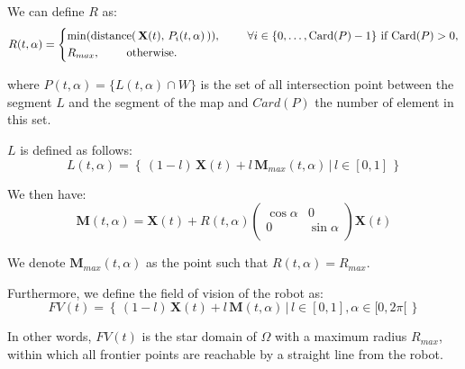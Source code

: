 \documentclass[../main.tex]{subfiles}
\begin{document}
\vspace{0.5em}

We can define $R$ as: 
\begin{equation*}
	\displaystyle
	R(t, \alpha) = 
	\begin{cases*}
		\min(\text{\rmfamily distance}( \, \mathbf{X}(t), \, P_i(t, \alpha) \,)),~~~~~~~ \forall i \in \{0, \ldots, \text{\rmfamily Card}(P) - 1\} ~\text{\rmfamily if Card}(P) > 0,\\
		R_{max}, ~~~~~~~\text{\rmfamily otherwise}.
	\end{cases*}
\end{equation*}
\vspace{0.5em}


where $P(t, \alpha) = \{L(t, \alpha) \cap W\}$ is the set of all intersection point between the segment $L$ and the segment of the map and $Card(P)$ the number of element in this set.
\vspace{0.5em}

$L$ is defined as follows:
\begin{equation*}
	\displaystyle
	L(t, \alpha) = \left\{ \, (1 - l) \, \mathbf{X}(t) + l\, \mathbf{M}_{max}(t, \alpha) \,|\, l \in [0, 1]\, \right\}
\end{equation*}

We then have:
\begin{equation*}
	\displaystyle
	\mathbf{M}(t, \alpha) = \mathbf{X}(t) + R(t, \alpha) 
	\begin{pmatrix}
		\cos \alpha & 0\\
		0 & \sin \alpha\\
	\end{pmatrix} 
	\mathbf{X}(t)
\end{equation*}

We denote $\mathbf{M}_{max} (t, \alpha)$ as the point such that $R(t, \alpha) = R_{max}$.
\vspace{0.5em}

Furthermore, we define the field of vision of the robot as:
\begin{equation}
	\displaystyle
	FV(t) = \left\{ \, (1 - l) \, \mathbf{X}(t) + l\, \mathbf{M}(t, \alpha) \,|\, l \in [0, 1], \alpha \in [0, 2 \pi[ \, \right\}
\end{equation}

In other words, $FV(t)$ is the star domain of $\Omega$ with a maximum radius $R_{max}$, within which all frontier points are reachable by a straight line from the robot.

\vspace{0.5em}
\end{document}
